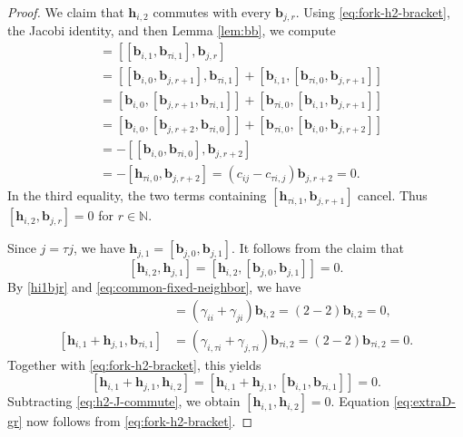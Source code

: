 \documentclass[11pt,reqno]{amsart}
\numberwithin{equation}{section}
\theoremstyle{definition}
\theoremstyle{remark}
\newcommand{\bN}{\mathbb{N}}
\newcommand{\bb}{\mathbf{b}}
\newcommand{\bh}{\mathbf{h}}
\begin{document}
\begin{proof}
We claim that $\bh_{i,2}$ commutes with every $\bb_{j,r}$.  Using
\eqref{eq:fork-h2-bracket}, the Jacobi identity, and then
Lemma \ref{lem:bb}, we compute
\begin{align*}
 [\bh_{i,2},\bb_{j,r}]
 &=
 [[\bb_{i,1},\bb_{\tau i,1}],\bb_{j,r}]
 \\
 &=
 [[\bb_{i,0},\bb_{j,r+1}],\bb_{\tau i,1}]
 +
 [\bb_{i,1},[\bb_{\tau i,0},\bb_{j,r+1}]]
 \\
 &=
 [\bb_{i,0},[\bb_{j,r+1},\bb_{\tau i,1}]]
 +
 [\bb_{\tau i,0},[\bb_{i,1},\bb_{j,r+1}]]
 \\
 &=
 [\bb_{i,0},[\bb_{j,r+2},\bb_{\tau i,0}]]
 +
 [\bb_{\tau i,0},[\bb_{i,0},\bb_{j,r+2}]]
 \\
 &=
 -[[\bb_{i,0},\bb_{\tau i,0}],\bb_{j,r+2}]
 \\
 &=
 -[\bh_{\tau i,0},\bb_{j,r+2}]
 =
 (c_{ij}-c_{\tau i,j})\bb_{j,r+2}
 =
 0.
\end{align*}
In the third equality, the two terms containing
$[\bh_{\tau i,1},\bb_{j,r+1}]$ cancel.  Thus $[\bh_{i,2},\bb_{j,r}]=0$ for $r\in\bN$.


Since $j=\tau j$, we have $\bh_{j,1}=[\bb_{j,0},\bb_{j,1}]$. It follows from the claim that 
\begin{equation}\label{eq:h2-J-commute}
 [\bh_{i,2},\bh_{j,1}]
 =
 [\bh_{i,2},[\bb_{j,0},\bb_{j,1}]]
 =
 0.
\end{equation}
By \eqref{hi1bjr} and
\eqref{eq:common-fixed-neighbor}, we have
\begin{align*}
 [\bh_{i,1}+\bh_{j,1},\bb_{i,1}]
 &=
 (\gamma_{ii}+\gamma_{ji})\bb_{i,2}
 =
 (2-2)\bb_{i,2}=0,
 \\
 [\bh_{i,1}+\bh_{j,1},\bb_{\tau i,1}]
 &=
 (\gamma_{i,\tau i}+\gamma_{j,\tau i})
 \bb_{\tau i,2}
 =
 (2-2)\bb_{\tau i,2}=0.
\end{align*}
Together with \eqref{eq:fork-h2-bracket}, this yields
\[
[\bh_{i,1}+\bh_{j,1},\bh_{i,2}]
 =
 [\bh_{i,1}+\bh_{j,1},[\bb_{i,1},\bb_{\tau i,1}]]
 =
 0.
\]
Subtracting \eqref{eq:h2-J-commute}, we obtain $[\bh_{i,1},\bh_{i,2}]=0$.
Equation \eqref{eq:extraD-gr} now follows from
\eqref{eq:fork-h2-bracket}.
\end{proof}
\end{document}
